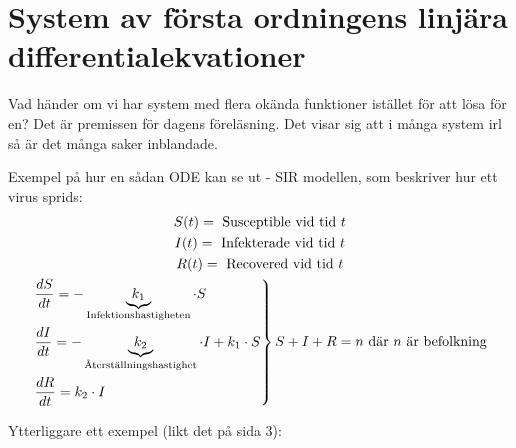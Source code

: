 \section{System av första ordningens linjära differentialekvationer}
\par\bigskip
\noindent Vad händer om vi har system med flera okända funktioner istället för att lösa för en? Det är premissen för dagens föreläsning. Det visar sig att i många system irl så är det många saker inblandade.
\par\bigskip
\noindent Exempel på hur en sådan ODE kan se ut - SIR modellen, som beskriver hur ett virus sprids:
\begin{equation*}
  \begin{gathered}
    S(t) = \text{ Susceptible vid tid }t\\
    I(t) = \text{ Infekterade vid tid }t\\
    R(t) = \text{ Recovered vid tid }t\\
    \begin{rcases*}
      \dfrac{dS}{dt} = -\underbrace{k_1}_{\text{Infektionshastigheten}}\cdot S\\
      \dfrac{dI}{dt} = -\underbrace{k_2}_{\text{Återställningshastighet}}\cdot I + k_1\cdot S\\
      \dfrac{dR}{dt} = k_2\cdot I
    \end{rcases*}S+I+R = n \text{ där $n$ är befolkning}
  \end{gathered}
\end{equation*}
\par\bigskip
\noindent Ytterliggare ett exempel (likt det på sida 3):

